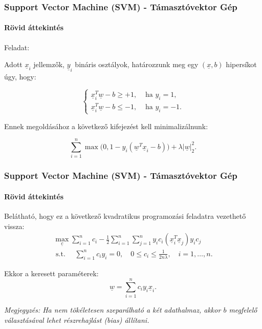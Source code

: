 \documentclass[11pt]{beamer}
\newcommand{\sumn}[1]{\sum\limits_{{#1}=1}^{n}}
\begin{document}
\begin{frame}
	\frametitle{Support Vector Machine (SVM) - Támasztóvektor Gép}
	\framesubtitle{Rövid áttekintés}
		
	Feladat: 
	
	Adott $ \underline{x}_i $ jellemzők, $ \underline{y}_i $ bináris osztályok, 
	határozzunk meg egy $ (\underline{x}, b) $ hipersíkot úgy, hogy: 
	
	\[
	\begin{cases}
	\underline{x}_i^T \underline{w} - b \geq +1, & \text{ ha }  y_i=1, \\
	\underline{x}_i^T \underline{w} - b \leq -1, & \text{ ha }  y_i=-1.
	\end{cases}
	\]	
	
	Ennek megoldásához a következő kifejezést kell minimalizálnunk:
	
	\[
	\sum\limits_{i=1}^{n} 
	\max\big(0, 1 - y_i(\underline{w}^T \underline{x}_i - b)\big) + \lambda \lvert\underline{w}\rvert_2^2.
	\]
	
	
	
\end{frame}

\begin{frame}
	\frametitle{Support Vector Machine (SVM) - Támasztóvektor Gép}
	\framesubtitle{Rövid áttekintés}
	
	Belátható, hogy ez a következő kvadratikus programozási feladatra vezethető vissza:
	\begin{multline*}
	\max\limits_{\underline{c}} \sum\limits_{i=1}^{n}c_i -  
	\frac{1}{2}\sumn{i}\sumn{j} y_i c_i (\underline{x}_i^T \underline{x}_j) y_i c_j \\
	\text{ s.t. } \quad 
	\sumn{i} c_i y_i = 0, \quad
	0 \leq c_i \leq \frac{1}{2n\lambda}, \quad 
	i=1,\dots,n.
	\end{multline*}
	
	Ekkor a keresett paraméterek:
	\[
	\underline{w} = \sumn{i} c_i y_i \underline{x}_i.
	\]
	
	
	\textit{Megjegyzés: Ha nem tökéletesen szeparálható a két adathalmaz, akkor $ b $ megfelelő választásával lehet részrehajlást (bias) állítani.}
\end{frame}
\end{document}
